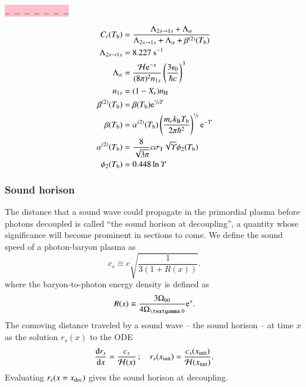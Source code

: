     \colorbox{pink}{\dots \, \dots \, \dots \, \dots \, \dots \, \dots \, \dots }

    \begin{subequations}\label{mil2:theo:eq:Peebles_add}
        \begin{align}
            C_r(T_\mathrm{b}) &= \frac{\Lambda_{2s\to 1s}+ \Lambda_{\alpha}}{\Lambda_{2s\to 1s} + \Lambda_\alpha + \beta^{(2)}(T_\mathrm{b})} \label{mil2:theo:eq:Peebles_Cr} \\
            \Lambda_{2s\to 1s} &=8.227~\mathrm{s}^{-1} \label{mil2:theo:eq:Peebles_Lambda_2s1s}  \\
            \Lambda_\alpha &= \frac{\mathcal{H}\mathrm{e}^{-x}}{(8\pi)^2 n_{1s}}\left( \frac{3\epsilon_0}{\hbar c}\right)^3 \label{mil2:theo:eq:Peebles_Lambda_alpha}  \\
            n_{1s} &= (1-X_e)n_\mathrm{H}\label{mil2:theo:eq:Peebles_n1s}\\
            \beta^{(2)}(T_\mathrm{b}) &= \beta(T_\mathrm{b})\mathrm{e}^{\sfrac{3}{4}\varUpsilon} \label{mil2:theo:eq:Peebles_beta2} \\
            \beta (T_\mathrm{b}) &= \alpha^{(2)}(T_\mathrm{b}) \left(\frac{m_e k_\mathrm{B} T_\mathrm{b}}{2\pi \hbar^2} \right)^{\sfrac{3}{2}} \mathrm{e}^{-\varUpsilon} \label{mil2:theo:eq:Peebles_beta}  \\
            \alpha^{(2)}(T_\mathrm{b}) &= \frac{8}{\sqrt{3\pi}} c\sigma_\mathrm{T} \sqrt{\varUpsilon} \phi_2(T_\mathrm{b}) \label{mil2:theo:eq:Peebles_alpha2} \\
            \phi_2(T_\mathrm{b}) &= 0.448\ln{\varUpsilon } \label{mil2:theo:eq:Peebles_phi2}
        \end{align}
    \end{subequations}


\subsubsection{Sound horison}\label{mil2:theo:eq:sound_horison}
    The distance that a sound wave could propagate in the primordial plasma before photons decoupled is called ``the sound horison at decoupling'', a quantity whose significance will become prominent in sections to come. We define the sound speed of a photon-baryon plasma as
    \begin{equation}
        c_s \equiv c\sqrt{\frac{1}{3(1+R(x))}}.
    \end{equation}
    where the baryon-to-photon energy density is defined as
    \begin{equation}
        R(x) \equiv \frac{3\Omega\ped{b0}}{4\Omega\gped{\textgamma 0}}\eu^x.
    \end{equation}
    The comoving distance traveled by a sound wave -- the sound horison -- at time $x$ as the solution $r_s(x)$ to the ODE
    \begin{equation}
        \dv{r_s}{x} = \frac{c_s}{\mathcal{H}(x)}\, ; \quad r_s(x_\mathrm{init}) = \frac{c_s(x_\mathrm{init})}{\mathcal{H}(x_\mathrm{init}) }.
    \end{equation}
    Evaluating $r_s(x=x_\mathrm{dec})$ gives the sound horison at decoupling.
